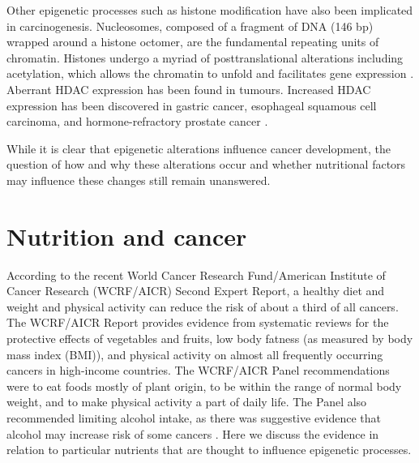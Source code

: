 \noindent Other epigenetic processes such as histone modification have also been implicated in carcinogenesis. Nucleosomes, composed of a fragment of DNA (146 bp) wrapped around a histone octomer, are the fundamental repeating units of chromatin. Histones undergo a myriad of posttranslational alterations including acetylation, which allows the chromatin to unfold and facilitates gene expression \cite{c224}. Aberrant HDAC expression has been found in tumours. Increased HDAC expression has been discovered in gastric cancer, esophageal squamous cell carcinoma, and hormone-refractory prostate cancer \cite{c225,c226}. 
 
\noindent While it is clear that epigenetic alterations influence cancer development, the question of how and why these alterations occur and whether nutritional factors may influence these changes still remain unanswered. 
 
\section[]{Nutrition and cancer} %
According to the recent World Cancer Research Fund/American Institute of Cancer Research (WCRF/AICR) Second Expert Report, a healthy diet and weight and physical activity can reduce the risk of about a third of all cancers. The WCRF/AICR Report provides evidence from systematic reviews for the protective effects of vegetables and fruits, low body fatness (as measured by body mass index (BMI)), and physical activity on almost all frequently occurring cancers in high-income countries. The WCRF/AICR Panel recommendations were to eat foods mostly of plant origin, to be within the range of normal body weight, and to make physical activity a part of daily life. The Panel also recommended limiting alcohol intake, as there was suggestive evidence that alcohol may increase risk of some cancers \cite{c214}. Here we discuss the evidence in relation to particular nutrients that are thought to influence epigenetic processes. 
 

